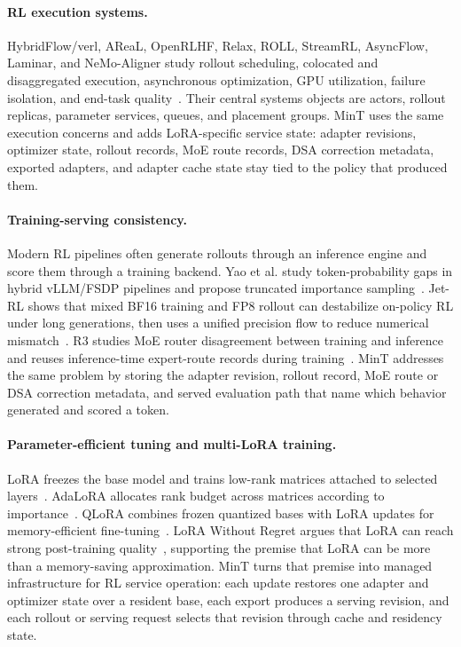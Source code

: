 \paragraph{RL execution systems.}
HybridFlow/verl, AReaL, OpenRLHF, Relax, ROLL, StreamRL, AsyncFlow, Laminar, and NeMo-Aligner study rollout scheduling, colocated and disaggregated execution, asynchronous optimization, GPU utilization, failure isolation, and end-task quality~\citep{hybridflow2025,areal2025,openrlhf2024,relax2026,roll2025,streamrl2025,asyncflow2025,laminar2025,nemoaligner2024}. Their central systems objects are actors, rollout replicas, parameter services, queues, and placement groups. MinT uses the same execution concerns and adds LoRA-specific service state: adapter revisions, optimizer state, rollout records, MoE route records, DSA correction metadata, exported adapters, and adapter cache state stay tied to the policy that produced them.

\paragraph{Training-serving consistency.}
Modern RL pipelines often generate rollouts through an inference engine and score them through a training backend. Yao et al. study token-probability gaps in hybrid vLLM/FSDP pipelines and propose truncated importance sampling~\citep{rollout_training_mismatch2025}. Jet-RL shows that mixed BF16 training and FP8 rollout can destabilize on-policy RL under long generations, then uses a unified precision flow to reduce numerical mismatch~\citep{jetrl2026}. R3 studies MoE router disagreement between training and inference and reuses inference-time expert-route records during training~\citep{r3_moe_router2025}. MinT addresses the same problem by storing the adapter revision, rollout record, MoE route or DSA correction metadata, and served evaluation path that name which behavior generated and scored a token.

\paragraph{Parameter-efficient tuning and multi-LoRA training.}
LoRA freezes the base model and trains low-rank matrices attached to selected layers~\citep{lora2022}. AdaLoRA allocates rank budget across matrices according to importance~\citep{adalora2023}. QLoRA combines frozen quantized bases with LoRA updates for memory-efficient fine-tuning~\citep{qlora2023}. LoRA Without Regret argues that LoRA can reach strong post-training quality~\citep{lora_without_regret_2025}, supporting the premise that LoRA can be more than a memory-saving approximation. MinT turns that premise into managed infrastructure for RL service operation: each update restores one adapter and optimizer state over a resident base, each export produces a serving revision, and each rollout or serving request selects that revision through cache and residency state.

